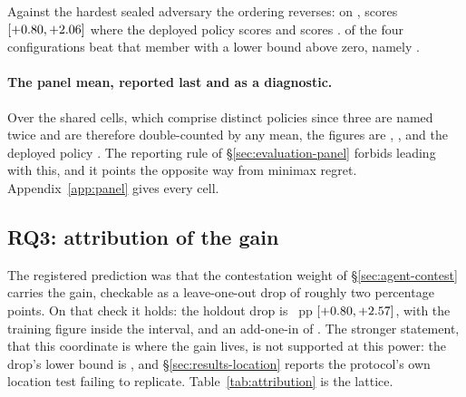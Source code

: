 \begin{table}[!ht]\centering
\caption{The far archetypes, where the minimax-regret differences are concentrated.}
\label{tab:farpanel}
{\tabfont}
\end{table}

Against the hardest sealed adversary the ordering reverses: on
\texttt{\vsevenHardSealed{}}, \sestina{} scores \vsevenHardFrozen{}
$[+0.80, +2.06]$ where the deployed policy scores
\vsevenHardIncumbent{} and \fcheap{} scores \vsevenHardFcheap{}. \vsevenHardBeaters{} of the four
configurations beat that member with a lower bound above zero, namely \vsevenHardBeaterNames{}.

\paragraph{The panel mean, reported last and as a diagnostic.} Over the \vsevenPanelMembers{} shared
cells, which comprise \vsevenPanelDistinct{} distinct policies since three are named twice and are
therefore double-counted by any mean, the figures are \sestina{} \vsevenPanelMeanFrozen{},
\composite{} \vsevenPanelMeanComposite{}, \fcheap{} \vsevenPanelMeanFcheap{} and the deployed policy
\vsevenPanelMeanIncumbent{}. The reporting rule of \S\ref{sec:evaluation-panel} forbids leading with
this, and it points the opposite way from minimax regret. Appendix~\ref{app:panel} gives every cell.

\subsection{RQ3: attribution of the gain}
\label{sec:results-attribution}

The registered prediction was that the contestation weight of \S\ref{sec:agent-contest} carries the
gain, checkable as a leave-one-out drop of roughly two percentage points. On that check it holds: the holdout
drop is \vsevenLooRtwelve{}~pp $[+0.80, +2.57]$, with the training figure
\vsevenTrainRtwelveLoo{} inside the interval, and an add-one-in of \vsevenAddInRtwelve{}. The stronger
statement, that this coordinate is where the gain lives, is not supported at this power: the drop's
lower bound is \vsevenLooRtwelveLo{}, and \S\ref{sec:results-location} reports the protocol's own
location test failing to replicate. Table~\ref{tab:attribution} is the lattice.

\begin{table}[!ht]\centering
\caption{The attribution lattice. Add-one-in is measured from the deployed \vsix{} policy;
leave-one-out is the drop from \sestina{}. Reference cell \sestina{} against the deployed policy
on the lattice banks: \vsevenBfiveWhole{} $[\vsevenBfiveWholeLo, \vsevenBfiveWholeHi]$.}
\label{tab:attribution}
{\tabfont}
\end{table}

